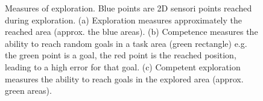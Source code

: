 \documentclass[12pt]{article}
\begin{document}
		\begin{figure}[H] 
			\centering 
			\hfil
			\hfil
			\caption{Measures of exploration. Blue points are 2D sensori points reached during exploration.
			(a) Exploration measures approximately the reached area (approx. the blue areas). 
			(b) Competence measures the ability to reach random goals in a task area (green rectangle) e.g. the green point is a goal, the red point is the reached position, leading to a high error for that goal. 
			(c) Competent exploration measures the ability to reach goals in the explored area (approx. green areas).}
		\end{figure}  	
\end{document}
